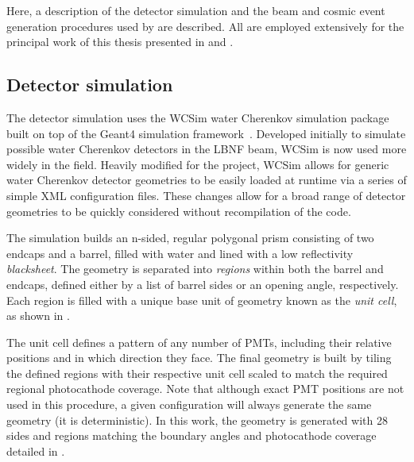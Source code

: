 Here, a description of the detector simulation and the beam and cosmic event generation procedures
used by \chips are described. All are employed extensively for the principal work of this thesis
presented in  and .

\subsection{Detector simulation} %
\label{sec:chips_monte_carlo_sim} %

The detector simulation uses the WCSim water Cherenkov simulation package~\cite{wcsim2020} built
on top of the Geant4 simulation framework~\cite{agostinelli2003, allison2006, allison2016}.
Developed initially to simulate possible water Cherenkov detectors in the LBNF beam, WCSim is now
used more widely in the field. Heavily modified for the \chips project, WCSim allows for generic
water Cherenkov detector geometries to be easily loaded at runtime via a series of simple XML
configuration files. These changes allow for a broad range of detector geometries to be quickly
considered without recompilation of the code.

The simulation builds an n-sided, regular polygonal prism consisting of two endcaps and a barrel,
filled with water and lined with a low reflectivity \emph{blacksheet}. The geometry is separated
into \emph{regions} within both the barrel and endcaps, defined either by a list of barrel sides
or an opening angle, respectively. Each region is filled with a unique base unit of geometry known
as the \emph{unit cell}, as shown in .

The unit cell defines a pattern of any number of PMTs, including their relative positions and in
which direction they face. The final geometry is built by tiling the defined regions with their
respective unit cell scaled to match the required regional photocathode coverage. Note that
although exact PMT positions are not used in this procedure, a given configuration will always
generate the same geometry (it is deterministic). In this work, the \chipsfive geometry is
generated with 28 sides and regions matching the boundary angles and photocathode coverage
detailed in .

